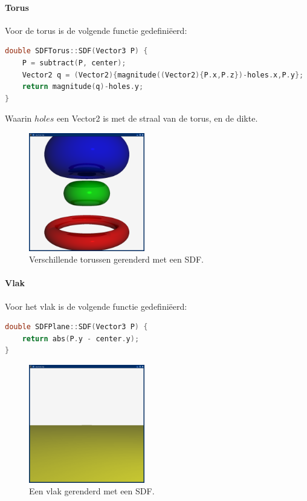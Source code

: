 \documentclass[12pt, a4paper]{article}
\begin{document}
\clearpage

\paragraph{Torus}
Voor de torus is de volgende functie gedefiniëerd:
\begin{lstlisting}[language=C++]
double SDFTorus::SDF(Vector3 P) {
    P = subtract(P, center);
    Vector2 q = (Vector2){magnitude((Vector2){P.x,P.z})-holes.x,P.y};
    return magnitude(q)-holes.y;
}
\end{lstlisting}

Waarin $holes$ een Vector2 is met de straal van de torus, en de dikte.

\begin{figure}[H]
    \centering
    \includegraphics[width=0.45\textwidth]{renders/tori.png}
    \caption{Verschillende torussen gerenderd met een SDF.}
    \label{fig:tori}
\end{figure}

\paragraph{Vlak}
Voor het vlak is de volgende functie gedefiniëerd:
\begin{lstlisting}[language=C++]
double SDFPlane::SDF(Vector3 P) {
    return abs(P.y - center.y);
}
\end{lstlisting}



\begin{figure}[H]
    \centering
    \includegraphics[width=0.45\textwidth]{renders/plane.png}
    \caption{Een vlak gerenderd met een SDF.}
    \label{fig:plane}
\end{figure}
\end{document}
